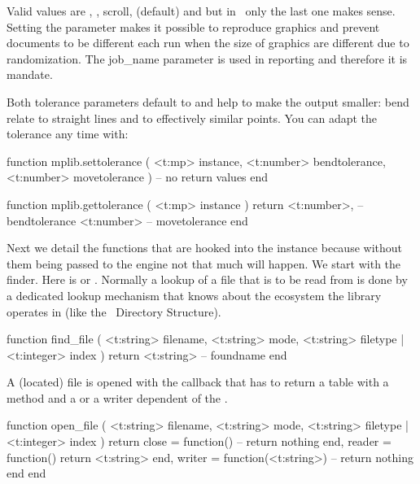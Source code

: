 Valid  values are , , \type
{scroll},  (default) and  but in \CONTEXT\ only
the last one makes sense. Setting the  parameter makes it
possible to reproduce graphics and prevent documents to be different each run
when the size of graphics are different due to randomization. The \type
{job_name} parameter is used in reporting and therefore it is mandate.

Both tolerance parameters default to  and help to make the output smaller: \quote
{bend} relate to straight lines and  to effectively similar points.
You can adapt the tolerance any time with:

\starttyping[option=LUA]
function mplib.settolerance (
    <t:mp>     instance,
    <t:number> bendtolerance,
    <t:number> movetolerance
)
    -- no return values
end
\stoptyping

\starttyping[option=LUA]
function mplib.gettolerance ( <t:mp> instance )
    return
        <t:number>, -- bendtolerance
        <t:number>  -- movetolerance
end
\stoptyping

Next we detail the functions that are hooked into the instance because without
them being passed to the engine not that much will happen. We start with the
finder. Here  is  or . Normally a lookup of a file
that is to be read from is done by a dedicated lookup mechanism that knows about
the ecosystem the library operates in (like the \TEX\ Directory Structure).

\starttyping[option=LUA]
function find_file (
    <t:string> filename,
    <t:string> mode,
    <t:string> filetype | <t:integer> index
)
    return <t:string> -- foundname
end
\stoptyping


A (located) file is opened with the  callback that has to
return a table with a  method and a  or a \type
{writer} dependent of the .

\starttyping[option=LUA]
function open_file (
    <t:string> filename,
    <t:string> mode,
    <t:string> filetype | <t:integer> index
)
    return {
        close  = function()
            -- return nothing
        end,
        reader = function()
            return <t:string>
        end,
        writer = function(<t:string>)
            -- return nothing
        end
    }
end
\stoptyping


